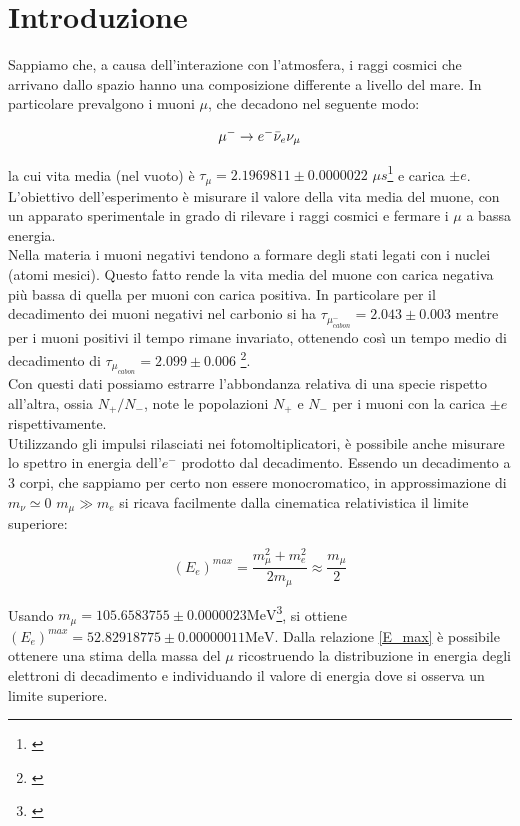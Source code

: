 \documentclass[10pt,a4paper]{article}
\begin{document}
\newpage

\section{Introduzione}\label{sec:intro}

\begin{flushleft}
Sappiamo che, a causa dell'interazione con l'atmosfera, i raggi cosmici che arrivano dallo spazio hanno una composizione differente a livello del mare. In particolare prevalgono i muoni $\mu$, che decadono nel seguente modo:

\begin{equation}\label{mu_decay}
    \ce{$\mu^{-}\rightarrow e^{-}\bar \nu_e \nu_{\mu}$}
\end{equation}

la cui vita media (nel vuoto) è $\tau_{\mu} = 2.1969811 \pm 0.0000022 $ $\mu s$\footnote{\cite{PDG2024MuonListing}} e carica $\pm e$.\\
L'obiettivo dell'esperimento è misurare il valore della vita media del muone, con un apparato sperimentale in grado di rilevare i raggi cosmici e fermare i $\mu$ a bassa energia. \\
Nella materia i muoni negativi tendono a formare degli stati legati con i nuclei (atomi mesici). Questo fatto rende la vita media del muone con carica negativa più bassa di quella per muoni con carica positiva. In particolare per il decadimento dei muoni negativi nel carbonio si ha $\tau_{\mu^-_{cabon}}=2.043 \pm 0.003$ mentre per i muoni positivi il tempo rimane invariato, ottenendo così un tempo medio di decadimento di  $\tau_{\mu_{cabon}}=2.099 \pm 0.006$ \footnote{\cite{GasparikSivertzNSRL2023}}.\\
Con questi dati possiamo estrarre l'abbondanza relativa di una specie rispetto all'altra, ossia $N_+/N_-$, note le popolazioni $N_+$ e $N_-$ per i muoni con la carica $\pm e$ rispettivamente.\\
Utilizzando gli impulsi rilasciati nei fotomoltiplicatori, è possibile anche misurare lo spettro in energia dell'$e^{-}$ prodotto dal decadimento. Essendo un decadimento a 3 corpi, che sappiamo per certo non essere monocromatico, in approssimazione di $m_{\nu} \simeq 0 $ $ m_\mu \gg m_e $ si ricava facilmente dalla cinematica relativistica il limite superiore:

\begin{equation}\label{E_max}
    (E_e)^{max} = \frac{m_{\mu}^2+m_{e}^2}{2m_{\mu}} \approx \frac{m_\mu}{2}
\end{equation}



Usando $m_\mu = 105.6583755 \pm 0.0000023\text{MeV}$\footnote{\cite{PDG2024MuonListing}}, si ottiene  $(E_e)^{max} =52.82918775 \pm 0.00000011 \text{MeV}$. 
Dalla relazione \ref{E_max} è possibile ottenere una stima della massa del $\mu$ ricostruendo la distribuzione in energia degli elettroni di decadimento e individuando il valore di energia dove si osserva un limite superiore.

\end{flushleft}
\newpage
\end{document}
